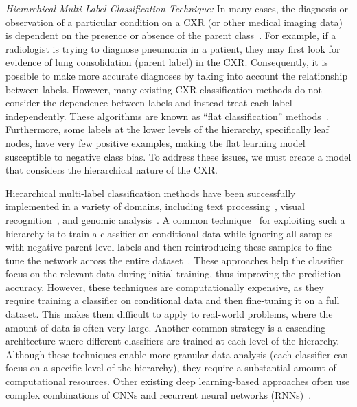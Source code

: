 \documentclass[review,1p,times,numbers]{elsarticle}
\begin{document}
\textit{Hierarchical Multi-Label Classification Technique: }
In many cases, the diagnosis or observation of a particular condition on a CXR (or other medical imaging data) is dependent on the presence or absence of the parent class~\cite{vaneeden_Relationship_2012}. For example, if a radiologist is trying to diagnose pneumonia in a patient, they may first look for evidence of lung consolidation (parent label) in the CXR\@. Consequently, it is possible to make more accurate diagnoses by taking into account the relationship between labels\@. However, many existing CXR classification methods do not consider the dependence between labels and instead treat each label independently. These algorithms are known as ``flat classification'' methods~\cite{alaydie_Exploiting_2012}. Furthermore, some labels at the lower levels of the hierarchy, specifically leaf nodes, have very few positive examples, making the flat learning model susceptible to negative class bias. To address these issues, we must create a model that considers the hierarchical nature of the CXR\@.

Hierarchical multi-label classification methods have been successfully implemented in a variety of domains, including text processing~\cite{aly_Hierarchical_2019}, visual recognition~\cite{bi_Mandatory_2014}, and genomic analysis~\cite{bi_BayesOptimal_2015}. A common technique~\cite{chen_Deep_2019} for exploiting such a hierarchy is to train a classifier on conditional data while ignoring all samples with negative parent-level labels and then reintroducing these samples to fine-tune the network across the entire dataset~\cite{chen_Deep_2019}. These approaches help the classifier focus on the relevant data during initial training, thus improving the prediction accuracy.  However, these techniques are computationally expensive, as they require training a classifier on conditional data and then fine-tuning it on a full dataset. This makes them difficult to apply to real-world problems, where the amount of data is often very large.   Another common strategy is a cascading architecture where different classifiers are trained at each level of the hierarchy. Although these techniques enable more granular data analysis (each classifier can focus on a specific level of the hierarchy), they require a substantial amount of computational resources. Other existing deep learning-based approaches often use complex combinations of CNNs and recurrent neural networks (RNNs)~\cite{guo_CNNRNN_2018,kowsari_HDLTex_2017}.
\end{document}

